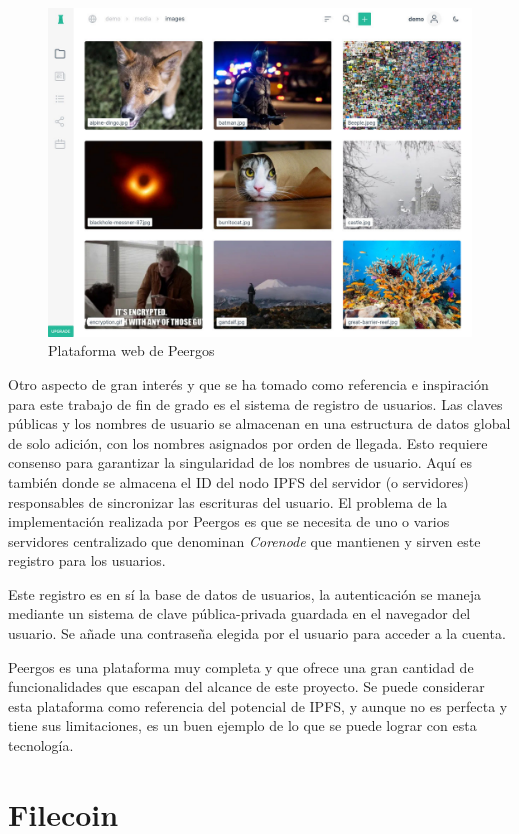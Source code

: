 \begin{figure}[H]
    \centering
    \small
    \includegraphics[width=0.8\linewidth]{images/peergos.jpg}
    \caption{Plataforma web de Peergos}
    \label{fig:peergos}
\end{figure}

Otro aspecto de gran interés y que se ha tomado como referencia e inspiración para este trabajo de fin de grado es el sistema de
registro de usuarios. Las claves públicas y los nombres de usuario se almacenan en una estructura de datos global de solo adición,
con los  nombres asignados por orden de llegada. Esto requiere consenso para garantizar la singularidad de los nombres de usuario.
Aquí es también donde se almacena el ID del nodo IPFS del servidor (o servidores) responsables de sincronizar las escrituras del
usuario. El problema de la implementación realizada por Peergos es que se necesita de uno o varios servidores centralizado
que denominan \textit{Corenode} que mantienen y sirven este registro para los usuarios.

Este registro es en sí la base de datos de usuarios, la autenticación se maneja mediante un sistema de clave pública-privada
guardada en el navegador del usuario. Se añade una contraseña elegida por el usuario para acceder a la cuenta.

Peergos es una plataforma muy completa y que ofrece una gran cantidad de funcionalidades que escapan del alcance de este proyecto.
Se puede considerar esta plataforma como referencia del potencial de IPFS, y aunque no es perfecta y tiene sus limitaciones, es un buen ejemplo de lo que se puede lograr con esta tecnología.

\section{Filecoin}

